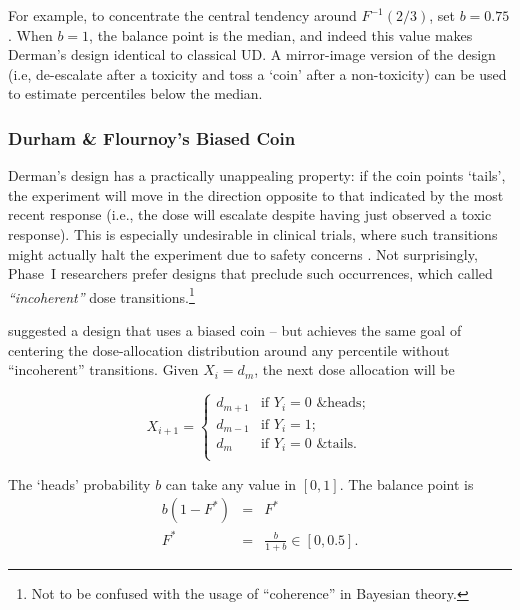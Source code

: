 For example, to concentrate the central tendency around $F^{-1}(2/3)$, set $b=0.75$. When $b=1$, the balance point is the median, and indeed this value makes Derman's design identical to classical UD. A mirror-image version of the design (i.e, de-escalate after a toxicity and toss a `coin' after a non-toxicity) can be used to estimate percentiles below the median.

\subsubsection{Durham \& Flournoy's  Biased Coin}

Derman's design has a practically unappealing property: if the coin points `tails', the experiment will move in the direction opposite to that indicated by the most recent response (i.e., the dose will escalate despite having just observed a toxic response). This is especially undesirable in clinical trials, where such transitions might actually halt the experiment due to safety concerns \citep{Neunsch08}. Not surprisingly, Phase~I researchers prefer designs that preclude such occurrences, which \cite{Cheung:coherent:05} called \emph{``incoherent''} dose transitions.\footnote{Not to be confused with the usage of ``coherence'' in Bayesian theory.}

\cite{Durh:Flou:rand:1994} suggested a design that uses a biased coin -- but achieves the same goal of centering the dose-allocation distribution around any percentile without ``incoherent'' transitions. Given $X_i=d_m$, the next dose allocation will be

\begin{equation}\label{eq:DF_BCD}
X_{i+1}=
\begin{cases}
d_{m+1} &\textrm{if $Y_i=0$ \& heads};\\
d_{m-1} &\textrm{if $Y_i=1$};\\
d_m &\textrm{if $Y_i=0$ \& tails}.\\
\end{cases}
\end{equation}

The `heads' probability $b$ can take any value in $[0,1]$. The balance point is
\begin{equation}\label{eq:bcdx*}
\begin{array}{rcl}
    b\left(1-F^*\right) &=& F^*\\
    F^* &=& \frac{b}{1+b}\in[0,0.5].
\end{array}
\end{equation}

